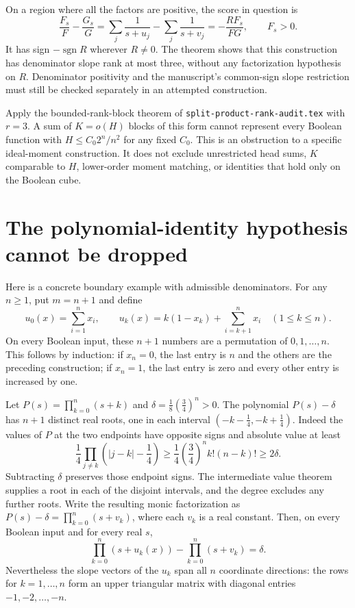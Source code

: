 \documentclass[11pt]{article}
\begin{document}
On a region where all the factors are positive, the score in question is
\[
 \frac{F_s}{F}-\frac{G_s}{G}
 =\sum_j\frac1{s+u_j}-\sum_j\frac1{s+v_j}
 =-\frac{R F_s}{FG},\qquad F_s>0.
\]
It has sign $-\operatorname{sgn}R$ wherever $R\ne0$. The theorem
shows that this construction has denominator slope rank at most three,
without any factorization hypothesis on $R$. Denominator positivity and
the manuscript's common-sign slope restriction must still be checked
separately in an attempted construction.

Apply the bounded-rank-block theorem of
\texttt{split-product-rank-audit.tex} with $r=3$. A sum of
$K=o(H)$ blocks of this form cannot represent every Boolean function
with $H\le C_0 2^n/n^2$ for any fixed $C_0$. This is an obstruction
to a specific ideal-moment construction. It does not exclude unrestricted
head sums, $K$ comparable to $H$, lower-order moment matching, or
identities that hold only on the Boolean cube.

\section{The polynomial-identity hypothesis cannot be dropped}

Here is a concrete boundary example with admissible denominators.
For any $n\ge1$, put $m=n+1$ and define
\[
 u_0(x)=\sum_{i=1}^n x_i,\qquad
 u_k(x)=k(1-x_k)+\sum_{i=k+1}^n x_i\quad(1\le k\le n).
\]
On every Boolean input, these $n+1$ numbers are a permutation of
$0,1,\ldots,n$. This follows by induction: if $x_n=0$, the last
entry is $n$ and the others are the preceding construction; if
$x_n=1$, the last entry is zero and every other entry is increased
by one.

Let $P(s)=\prod_{k=0}^n(s+k)$ and
$\delta=\frac18(\frac34)^n>0$. The polynomial $P(s)-\delta$ has
$n+1$ distinct real roots, one in each interval
$(-k-\frac14,-k+\frac14)$. Indeed the values of $P$ at the two
endpoints have opposite signs and absolute value at least
\[
 \frac14\prod_{j\ne k}\left(|j-k|-\frac14\right)
 \ge\frac14\left(\frac34\right)^n k!(n-k)!
 \ge2\delta.
\]
Subtracting $\delta$ preserves those endpoint signs. The intermediate
value theorem supplies a root in each of the disjoint intervals, and
the degree excludes any further roots. Write the resulting monic
factorization as $P(s)-\delta=\prod_{k=0}^n(s+v_k)$, where each
$v_k$ is a real constant.
Then, on every Boolean input and for every real $s$,
\[
 \prod_{k=0}^n(s+u_k(x))-\prod_{k=0}^n(s+v_k)=\delta.
\]
Nevertheless the slope vectors of the $u_k$ span all $n$ coordinate
directions: the rows for $k=1,\ldots,n$ form an upper triangular
matrix with diagonal entries $-1,-2,\ldots,-n$.
\end{document}
